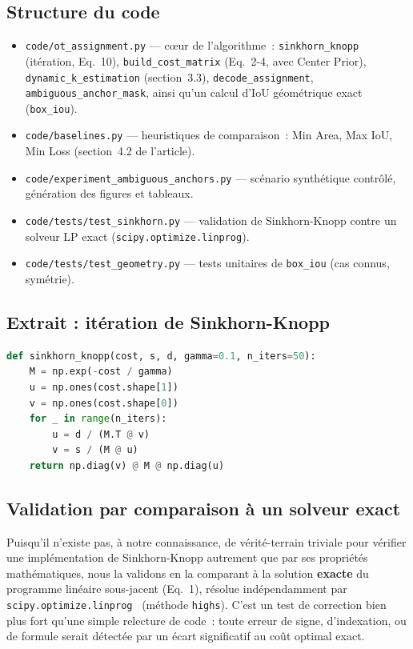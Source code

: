 \documentclass[11pt,a4paper]{article}
\begin{document}
\subsection{Structure du code}
\begin{itemize}
  \item \texttt{code/ot\_assignment.py} --- cœur de l'algorithme~: \texttt{sinkhorn\_knopp} (itération, Eq.~10), \texttt{build\_cost\_matrix} (Eq.~2-4, avec Center Prior), \texttt{dynamic\_k\_estimation} (section~3.3), \texttt{decode\_assignment}, \texttt{ambiguous\_anchor\_mask}, ainsi qu'un calcul d'IoU géométrique exact (\texttt{box\_iou}).
  \item \texttt{code/baselines.py} --- heuristiques de comparaison~: Min Area, Max IoU, Min Loss (section~4.2 de l'article).
  \item \texttt{code/experiment\_ambiguous\_anchors.py} --- scénario synthétique contrôlé, génération des figures et tableaux.
  \item \texttt{code/tests/test\_sinkhorn.py} --- validation de Sinkhorn-Knopp contre un solveur LP exact (\texttt{scipy.optimize.linprog}).
  \item \texttt{code/tests/test\_geometry.py} --- tests unitaires de \texttt{box\_iou} (cas connus, symétrie).
\end{itemize}

\subsection{Extrait : itération de Sinkhorn-Knopp}
\begin{lstlisting}[language=Python, caption={Cœur de l'itération de Sinkhorn-Knopp, traduction directe de l'Eq. 10}]
def sinkhorn_knopp(cost, s, d, gamma=0.1, n_iters=50):
    M = np.exp(-cost / gamma)
    u = np.ones(cost.shape[1])
    v = np.ones(cost.shape[0])
    for _ in range(n_iters):
        u = d / (M.T @ v)
        v = s / (M @ u)
    return np.diag(v) @ M @ np.diag(u)
\end{lstlisting}

\subsection{Validation par comparaison à un solveur exact}
Puisqu'il n'existe pas, à notre connaissance, de \og vérité-terrain\fg{} triviale pour vérifier une implémentation de Sinkhorn-Knopp autrement que par ses propriétés mathématiques, nous la validons en la comparant à la solution \textbf{exacte} du programme linéaire sous-jacent (Eq.~1), résolue indépendamment par \texttt{scipy.optimize.linprog}~\cite{scipy} (méthode \texttt{highs}). C'est un test de correction bien plus fort qu'une simple relecture de code~: toute erreur de signe, d'indexation, ou de formule serait détectée par un écart significatif au coût optimal exact.
\end{document}

